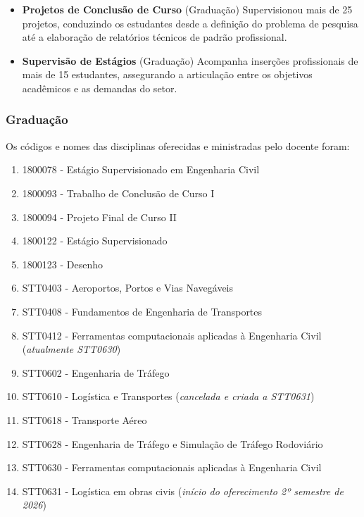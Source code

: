 \documentclass[
  brazilian,
  11pt,
  a4paper,
]{article}
\providecommand{\tightlist}{%
  \setlength{\itemsep}{0pt}\setlength{\parskip}{0pt}}
\begin{document}
\begin{enumerate}
  \begin{itemize}
  \tightlist
  \item
    \textbf{Projetos de Conclusão de Curso} (Graduação) Supervisionou
    mais de 25 projetos, conduzindo os estudantes desde a definição do
    problema de pesquisa até a elaboração de relatórios técnicos de
    padrão profissional.
  \item
    \textbf{Supervisão de Estágios} (Graduação) Acompanha inserções
    profissionais de mais de 15 estudantes, assegurando a articulação
    entre os objetivos acadêmicos e as demandas do setor.
  \end{itemize}
\end{enumerate}

\subsubsection{Graduação}\label{graduauxe7uxe3o}

Os códigos e nomes das disciplinas oferecidas e ministradas pelo docente
foram:

\begin{enumerate}
\def\labelenumi{\arabic{enumi}.}
\tightlist
\item
  1800078 - Estágio Supervisionado em Engenharia Civil
\item
  1800093 - Trabalho de Conclusão de Curso I
\item
  1800094 - Projeto Final de Curso II
\item
  1800122 - Estágio Supervisionado
\item
  1800123 - Desenho
\item
  STT0403 - Aeroportos, Portos e Vias Navegáveis
\item
  STT0408 - Fundamentos de Engenharia de Transportes
\item
  STT0412 - Ferramentas computacionais aplicadas à Engenharia Civil
  (\emph{atualmente STT0630})
\item
  STT0602 - Engenharia de Tráfego
\item
  STT0610 - Logística e Transportes (\emph{cancelada e criada a
  STT0631})
\item
  STT0618 - Transporte Aéreo
\item
  STT0628 - Engenharia de Tráfego e Simulação de Tráfego Rodoviário
\item
  STT0630 - Ferramentas computacionais aplicadas à Engenharia Civil
\item
  STT0631 - Logística em obras civis (\emph{início do oferecimento 2º
  semestre de 2026})
\end{enumerate}
\end{document}
